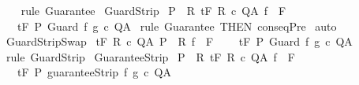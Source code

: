 \begin{isabellebody}
%
\isadelimproof
\ \ %
\endisadelimproof
%
\isatagproof
{}\isamarkupfalse%
\ {\isacharparenleft}rule\ Guarantee{\isacharparenright}%
\endisatagproof
{\isafoldproof}%
%
\isadelimproof
\isanewline
%
\endisadelimproof
\isanewline
\isanewline
{}\isamarkupfalse%
\ GuardStrip{\isacharcolon}\isanewline
\ {\isachardoublequoteopen}{\isasymlbrakk}P\ {\isasymsubseteq}\ R{\isacharsemicolon}\ {\isasymGamma}{\isacharcomma}{\isasymTheta}{\isasymturnstile}\isactrlsub t\isactrlbsub {\isacharslash}F\isactrlesub \ R\ c\ Q{\isacharcomma}A{\isacharsemicolon}\ f\ {\isasymin}\ F{\isasymrbrakk}\ \isanewline
\ \ {\isasymLongrightarrow}\ {\isasymGamma}{\isacharcomma}{\isasymTheta}{\isasymturnstile}\isactrlsub t\isactrlbsub {\isacharslash}F\isactrlesub \ P\ {\isacharparenleft}Guard\ f\ g\ c{\isacharparenright}\ Q{\isacharcomma}A{\isachardoublequoteclose}\isanewline
%
\isadelimproof
%
\endisadelimproof
%
\isatagproof
{}\isamarkupfalse%
\ {\isacharparenleft}rule\ Guarantee\ {\isacharbrackleft}THEN\ conseqPre{\isacharbrackright}{\isacharparenright}\isanewline
{}\isamarkupfalse%
\ auto\isanewline
{}\isamarkupfalse%
%
\endisatagproof
{\isafoldproof}%
%
\isadelimproof
\isanewline
%
\endisadelimproof
\isanewline
{}\isamarkupfalse%
\ GuardStripSwap{\isacharcolon}\isanewline
\ {\isachardoublequoteopen}{\isasymlbrakk}{\isasymGamma}{\isacharcomma}{\isasymTheta}{\isasymturnstile}\isactrlsub t\isactrlbsub {\isacharslash}F\isactrlesub \ R\ c\ Q{\isacharcomma}A{\isacharsemicolon}\ P\ {\isasymsubseteq}\ R{\isacharsemicolon}\ f\ {\isasymin}\ F{\isasymrbrakk}\ \isanewline
\ \ {\isasymLongrightarrow}\ {\isasymGamma}{\isacharcomma}{\isasymTheta}{\isasymturnstile}\isactrlsub t\isactrlbsub {\isacharslash}F\isactrlesub \ P\ {\isacharparenleft}Guard\ f\ g\ c{\isacharparenright}\ Q{\isacharcomma}A{\isachardoublequoteclose}\isanewline
%
\isadelimproof
\ \ %
\endisadelimproof
%
\isatagproof
{}\isamarkupfalse%
\ {\isacharparenleft}rule\ GuardStrip{\isacharparenright}%
\endisatagproof
{\isafoldproof}%
%
\isadelimproof
\isanewline
%
\endisadelimproof
\isanewline
{}\isamarkupfalse%
\ GuaranteeStrip{\isacharcolon}\isanewline
\ {\isachardoublequoteopen}{\isasymlbrakk}P\ {\isasymsubseteq}\ R{\isacharsemicolon}\ {\isasymGamma}{\isacharcomma}{\isasymTheta}{\isasymturnstile}\isactrlsub t\isactrlbsub {\isacharslash}F\isactrlesub \ R\ c\ Q{\isacharcomma}A{\isacharsemicolon}\ f\ {\isasymin}\ F{\isasymrbrakk}\ \isanewline
\ \ {\isasymLongrightarrow}\ {\isasymGamma}{\isacharcomma}{\isasymTheta}{\isasymturnstile}\isactrlsub t\isactrlbsub {\isacharslash}F\isactrlesub \ P\ {\isacharparenleft}guaranteeStrip\ f\ g\ c{\isacharparenright}\ Q{\isacharcomma}A{\isachardoublequoteclose}\isanewline

\end{isabellebody}
